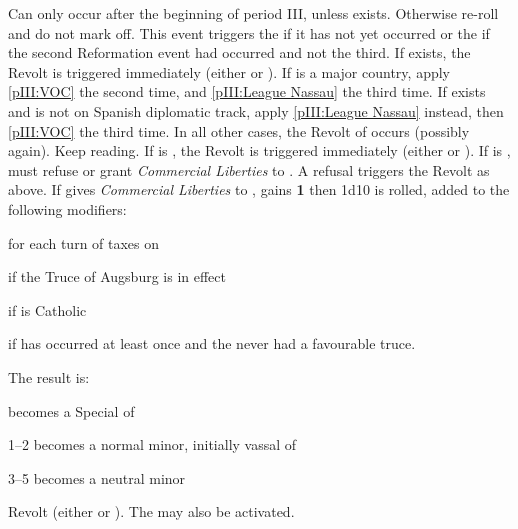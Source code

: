 \aparag Can only occur after the beginning of period III, unless
\paysVhollande exists. Otherwise re-roll and do not mark off.
\bparag This event triggers the  if it has not yet
occurred or the  if the second Reformation event had
occurred and not the third.
\bparag If \paysVhollande exists, the Revolt is triggered immediately (either
 or ).
\bparag If \HOL is a major country, apply \ref{pIII:VOC} the second time, and
\ref{pIII:League Nassau} the third time.
\bparag If \HOLmin exists and is not on Spanish diplomatic track, apply
\ref{pIII:League Nassau} instead, then \ref{pIII:VOC} the third time.
\bparag In all other cases, the Revolt of \HOL occurs (possibly again). Keep
reading.
\bparag If \SPA is \CATHCR, the Revolt is triggered immediately (either
 or ).
\bparag If \SPA is \CATHCO, \SPA must refuse or grant \emph{Commercial
  Liberties} to \paysHollande. A refusal triggers the Revolt as above.
\bparag If \SPA gives \emph{Commercial Liberties} to \paysHollande, \SPA gains
{\bf 1} \STAB then 1d10 is rolled, added to the following modifiers:
\begin{modlist}
\item[\bonus{+1}] for each turn of taxes on \paysHollande
\item[\bonus{-2}] if the Truce of Augsburg is in effect
\item[\bonus{-1}] if \ENG is Catholic
\item[\bonus{-1}] if  has occurred at least once and the
  \paysHuguenots never had a favourable truce.
\end{modlist}
The result is:
\begin{modlist}[2em]
\item[\textlessequal0] \paysHollande becomes a Special \VASSAL of
  \SPA{}
\item[1--2] \paysHollande becomes a normal minor, initially vassal of
  \SPA{}
\item[3--5] \paysHollande becomes a neutral minor%
\item[\textgreatequal6] Revolt (either 
  or ). The  may also be activated.
\end{modlist}


